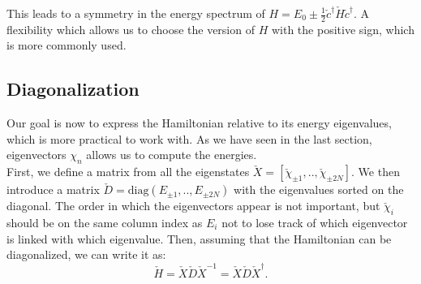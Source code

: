 \documentclass[../main.tex]{subfile}
\begin{document}
This leads to a symmetry in the energy spectrum of $H = E_0 \pm \frac{1}{2}\check{c}^{\dagger}\check{H}\check{c}^{\dagger}$.
A flexibility which allows us to choose the version of $H$ with the positive sign, which is more commonly used.\\

\subsection{Diagonalization} \label{sec:Diagonalization}
Our goal is now to express the Hamiltonian relative to its energy eigenvalues, which is more practical to work with.
As we have seen in the last section, eigenvectors $\chi_n$ allows us to compute the energies.\\

First, we define a matrix from all the eigenstates $\check{X} = [\check{\chi}_{\pm 1},..,\check{\chi}_{\pm 2N}]$.
We then introduce a matrix $\check{D} = \text{diag}(E_{\pm 1},..,E_{\pm 2N})$ with the eigenvalues sorted on the diagonal. The order in which the eigenvectors appear is not important,
but $\check{\chi}_{i}$ should be on the same column index as $E_{i}$ not to lose track of which eigenvector is linked with which eigenvalue.
Then, assuming that the Hamiltonian can be diagonalized, we can write it as:
\begin{equation}\label{eq:Diag_Ham}
    \check{H} = \check{X}\check{D}\check{X}^{-1} = \check{X}\check{D}\check{X}^{\dagger} .
\end{equation}
\end{document}
